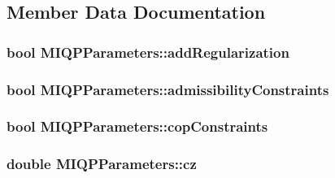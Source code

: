\subsection{\-Member \-Data \-Documentation}
\hypertarget{structMIQPParameters_a7e5417e18e6797739def8f916c3efc40}{
\subsubsection[{add\-Regularization}]{\setlength{\rightskip}{0pt plus 5cm}bool {\bf \-M\-I\-Q\-P\-Parameters\-::add\-Regularization}}}\label{structMIQPParameters_a7e5417e18e6797739def8f916c3efc40}
\hypertarget{structMIQPParameters_ae8e541722b3e3664ab516676aa1c16be}{
\subsubsection[{admissibility\-Constraints}]{\setlength{\rightskip}{0pt plus 5cm}bool {\bf \-M\-I\-Q\-P\-Parameters\-::admissibility\-Constraints}}}\label{structMIQPParameters_ae8e541722b3e3664ab516676aa1c16be}
\hypertarget{structMIQPParameters_a3a0fd04f9e8767097e44e02a740796bc}{
\subsubsection[{cop\-Constraints}]{\setlength{\rightskip}{0pt plus 5cm}bool {\bf \-M\-I\-Q\-P\-Parameters\-::cop\-Constraints}}}\label{structMIQPParameters_a3a0fd04f9e8767097e44e02a740796bc}
\hypertarget{structMIQPParameters_ab8158e2bf119d70c9856b6a277e3c42a}{
\subsubsection[{cz}]{\setlength{\rightskip}{0pt plus 5cm}double {\bf \-M\-I\-Q\-P\-Parameters\-::cz}}}\label{structMIQPParameters_ab8158e2bf119d70c9856b6a277e3c42a}
